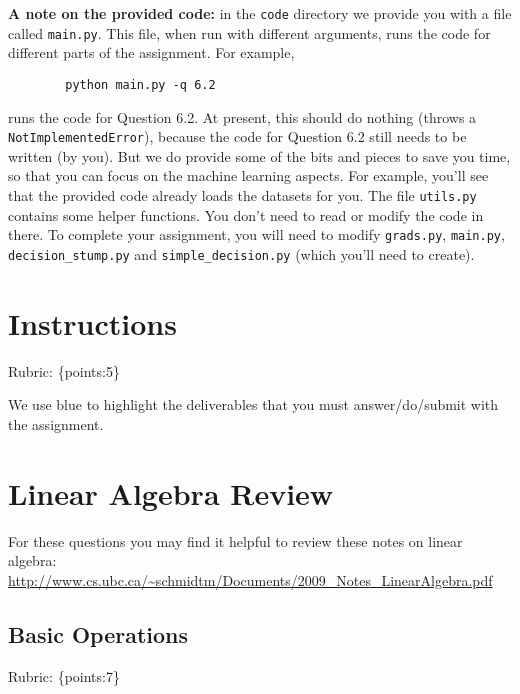 \documentclass{article}
\def\rubric#1{\gre{Rubric: \{#1\}}}{}
\def\blu#1{{\color{blu}#1}}
\def\gre#1{{\color{gre}#1}}
\begin{document}
	\textbf{A note on the provided code:} in the \texttt{code} directory we provide you with a file called
	\texttt{main.py}. This file, when run with different arguments, runs the code for different
	parts of the assignment. For example,
	\begin{verbatim}
		python main.py -q 6.2
	\end{verbatim}
	runs the code for Question 6.2. At present, this should do nothing (throws a \texttt{NotImplementedError}), because the code
	for Question 6.2 still needs to be written (by you). But we do provide some of the bits
	and pieces to save you time, so that you can focus on the machine learning aspects.
	For example, you'll see that the provided code already loads the datasets for you.
	The file \texttt{utils.py} contains some helper functions.
	You don't need to read or modify the code in there.
	To complete your assignment, you will need to modify \texttt{grads.py}, \texttt{main.py}, \texttt{decision\string_stump.py} and \texttt{simple\string_decision.py} (which you'll need to create).
	
	
	\section*{Instructions}
	\rubric{points:5}
	
	\vspace{1em}
	We use \blu{blue} to highlight the deliverables that you must answer/do/submit with the assignment.
	
	\section{Linear Algebra Review}
	
	For these questions you may find it helpful to review these notes on linear algebra:\\
	\url{http://www.cs.ubc.ca/~schmidtm/Documents/2009_Notes_LinearAlgebra.pdf}
	
	\subsection{Basic Operations}
	\rubric{points:7}
	
\end{document}
